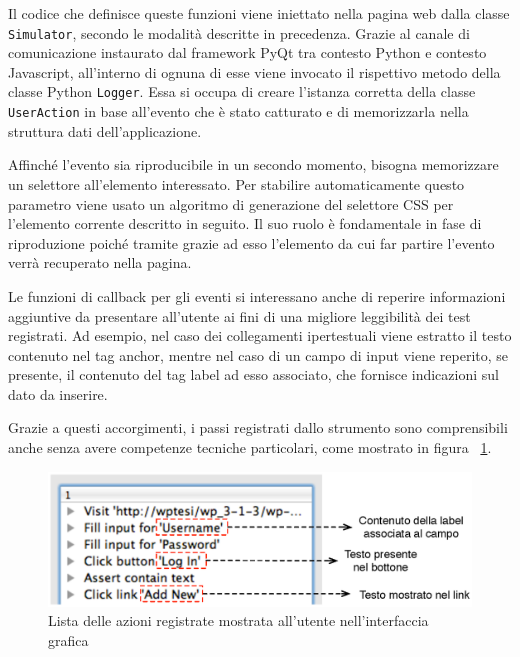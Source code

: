 Il codice che definisce queste funzioni viene iniettato nella pagina web dalla classe \verb|Simulator|, secondo le modalità descritte in precedenza. Grazie al canale di comunicazione instaurato dal framework PyQt tra contesto Python e contesto Javascript, all'interno di ognuna di esse viene invocato il rispettivo metodo della classe Python \verb|Logger|. Essa si occupa di creare l'istanza corretta della classe \verb|UserAction| in base all'evento che è stato catturato e di memorizzarla nella struttura dati dell'applicazione.



Affinché l'evento sia riproducibile in un secondo momento, bisogna memorizzare un selettore all'elemento interessato. Per stabilire automaticamente questo parametro viene usato un algoritmo di generazione del selettore CSS per l'elemento corrente descritto in seguito. Il suo ruolo è fondamentale in fase di riproduzione poiché tramite grazie ad esso l'elemento da cui far partire l'evento verrà recuperato nella pagina. 

Le funzioni di callback per gli eventi si interessano anche di reperire informazioni aggiuntive da presentare all'utente ai fini di una migliore leggibilità dei test registrati. Ad esempio, nel caso dei collegamenti ipertestuali viene estratto il testo contenuto nel tag anchor, mentre nel caso di un campo di input viene reperito, se presente, il contenuto del tag label ad esso associato, che fornisce indicazioni sul dato da inserire. 

Grazie a questi accorgimenti, i passi registrati dallo strumento sono comprensibili anche senza avere competenze tecniche particolari, come mostrato in figura ~\ref{fig:actionNotes}.

\begin{figure}[htbp]
\begin{center}
\includegraphics{images/action_notes.eps}
\caption{Lista delle azioni registrate mostrata all'utente nell'interfaccia grafica}
\label{fig:actionNotes}
\end{center}
\end{figure}

